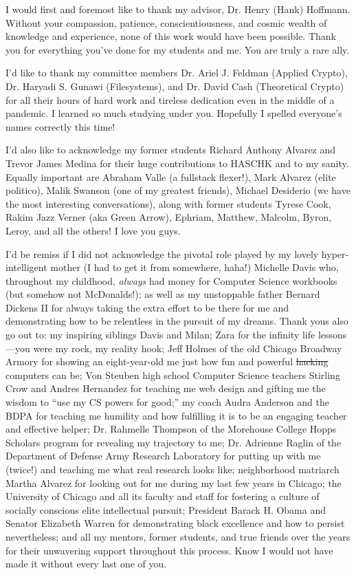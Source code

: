 \acknowledgments
I would first and foremost like to thank my advisor, Dr. Henry (Hank) Hoffmann.
Without your compassion, patience, conscientiousness, and cosmic wealth of
knowledge and experience, none of this work would have been possible. Thank you
for everything you've done for my students and me. You are truly a rare ally.

I'd like to thank my committee members Dr. Ariel J. Feldman (Applied Crypto),
Dr. Haryadi S. Gunawi (Filesystems), and Dr. David Cash (Theoretical Crypto) for
all their hours of hard work and tireless dedication even in the middle of a
pandemic. I learned so much studying under you. Hopefully I spelled everyone's
names correctly this time!

I'd also like to acknowledge my former students Richard Anthony Alvarez and
Trevor James Medina for their huge contributions to HASCHK and to my sanity.
Equally important are Abraham Valle (a fullstack flexer!), Mark Alvarez (elite
politico), Malik Swanson (one of my greatest friends), Michael Desiderio (we
have the most interesting conversations), along with former students Tyrese
Cook, Rakim Jazz Verner (aka Green Arrow), Ephriam, Matthew, Malcolm, Byron,
Leroy, and all the others! I love you guys.

I'd be remiss if I did not acknowledge the pivotal role played by my lovely
hyper-intelligent mother (I had to get it from somewhere, haha!) Michelle Davis
who, throughout my childhood, \emph{always} had money for Computer Science
workbooks (but somehow not McDonalds!); as well as my unstoppable father Bernard
Dickens II for always taking the extra effort to be there for me and
demonstrating how to be relentless in the pursuit of my dreams. Thank yous also
go out to: my inspiring siblings Davis and Milan; Zara for the infinity life
lessons---you were my rock, my reality hook; Jeff Holmes of the old Chicago
Broadway Armory for showing an eight-year-old me just how fun and powerful
\sout{hacking} computers can be; Von Steuben high school Computer Science
teachers Stirling Crow and Andres Hernandez for teaching me web design and
gifting me the wisdom to ``use my CS powers for good;'' my coach Audra Anderson
and the BDPA for teaching me humility and how fulfilling it is to be an engaging
teacher and effective helper; Dr. Rahmelle Thompson of the Morehouse College
Hopps Scholars program for revealing my trajectory to me; Dr. Adrienne Raglin of
the Department of Defense Army Research Laboratory for putting up with me
(twice!) and teaching me what real research looks like; neighborhood matriarch
Martha Alvarez for looking out for me during my last few years in Chicago; the
University of Chicago and all its faculty and staff for fostering a culture of
socially conscious elite intellectual pursuit; President Barack H. Obama and
Senator Elizabeth Warren for demonstrating black excellence and how to persist
nevertheless; and all my mentors, former students, and true friends over the
years for their unwavering support throughout this process. Know I would not
have made it without every last one of you.

